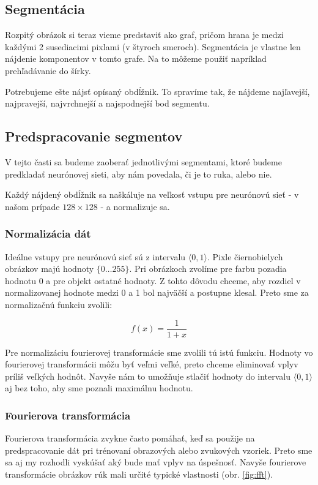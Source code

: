 \subsection{Segmentácia}\label{chap:segment}
Rozpitý obrázok si teraz vieme predstaviť ako graf, pričom hrana je medzi každými 2 susediacimi pixlami (v štyroch smeroch). Segmentácia je vlastne len nájdenie komponentov v tomto grafe. Na to môžeme použiť napríklad prehľadávanie do šírky. 

Potrebujeme ešte nájsť opísaný obdĺžnik. To spravíme tak, že nájdeme najľavejší, najpravejší, najvrchnejší a najspodnejší bod segmentu.

\subsection{Predspracovanie segmentov}
\label{sect:segmentpreprocessing}

V tejto časti sa budeme zaoberať jednotlivými segmentami, ktoré budeme predkladať neurónovej sieti, aby nám povedala, či je to ruka, alebo nie.

Každý nájdený obdĺžnik sa naškáluje na veľkosť vstupu pre neurónovú sieť - v našom prípade $128\times 128$ - a normalizuje sa. 

\subsubsection{Normalizácia dát} \label{chap:normalisation}
Ideálne vstupy pre neurónovú sieť sú z intervalu $\langle 0,1\rangle$. Pixle čiernobielych obrázkov majú hodnoty $\{0\dots 255\}$. Pri obrázkoch zvolíme pre farbu pozadia hodnotu 0 a pre objekt ostatné hodnoty. Z tohto dôvodu chceme, aby rozdiel v normalizovanej hodnote medzi 0 a 1 bol najväčší a postupne klesal. Preto sme za normalizačnú funkciu zvolili:

$$f(x)=\frac{1}{1+x}$$

Pre normalizáciu fourierovej transformácie sme zvolili tú istú funkciu. Hodnoty vo fourierovej transformácii môžu byť veľmi veľké, preto chceme eliminovať vplyv príliš veľkých hodnôt. Navyše nám to umožňuje stlačiť hodnoty do intervalu $\langle 0,1\rangle$ aj bez toho, aby sme poznali maximálnu hodnotu.

\subsubsection{Fourierova transformácia} \label{sect:ft}
Fourierova transformácia zvykne často pomáhať, keď sa použije na predspracovanie dát pri trénovaní obrazových alebo zvukových vzoriek. Preto sme sa aj my rozhodli vyskúšať aký bude mať vplyv na úspešnosť. Navyše fourierove transformácie obrázkov rúk mali určité typické vlastnosti (obr. \ref{fig:fft}).


